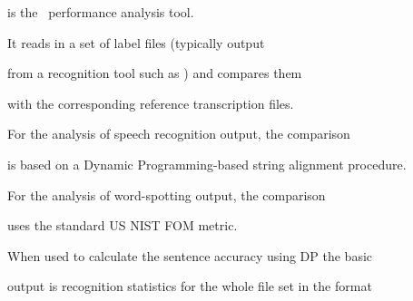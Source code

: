 













%




%








\newpage














 is the \HTK\ performance analysis tool.


It reads in a set of label files (typically output


from a recognition tool such as ) and compares them


with the corresponding reference transcription files.  


For the analysis of speech recognition output, the comparison


is based on a Dynamic Programming-based string alignment procedure.


For the analysis of word-spotting output, the comparison


uses the standard US NIST FOM metric.





When used to calculate the sentence accuracy using DP the basic 


output is recognition statistics for the whole file set in the format


